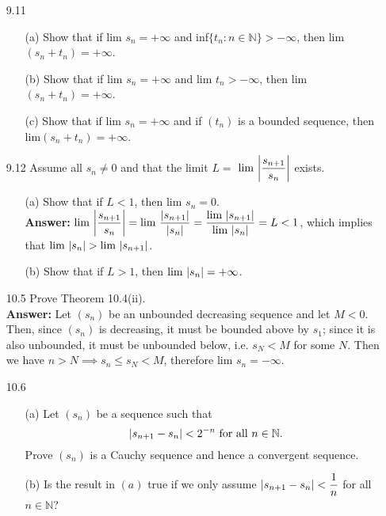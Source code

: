 \documentclass{article}
\begin{document}
\begin{itemize}
\begin{itemize}
\begin{itemize}
                        \end{itemize}
            \end{itemize}
      \item [9.11]
            \begin{itemize}
                  \item [(a)] Show that if $\text{lim }s_n=+\infty$ and inf$\{t_n:n\in\mathbb{N}\}>-\infty$, then lim$(s_n+t_n)=+\infty$.
                  \item [(b)] Show that if $\text{lim }s_n=+\infty$ and $\text{lim }t_n>-\infty$, then lim$(s_n+t_n)=+\infty$.
                  \item [(c)] Show that if $\text{lim }s_n=+\infty$ and if $(t_n)$ is a bounded sequence, then lim$(s_n+t_n)=+\infty$.
            \end{itemize}
      \item [9.12] Assume all $s_n\neq 0$ and that the limit $L=$ $\text{lim }\abs{\dfrac{s_{n+1}}{s_n}}$ exists.
            \begin{itemize}
                  \item [(a)] Show that if $L<1$, then $\text{lim }s_n=0$.\\
                  \textbf{Answer: } $\text{lim }\abs{\dfrac{s_{n+1}}{s_n}}=\text{lim }\dfrac{\abs{s_{n+1}}}{\abs{s_n}}=\dfrac{\text{lim }\abs{s_{n+1}}}{\text{lim }\abs{s_n}}=L<1$, which implies that $\text{lim }\abs{s_n}>\text{lim }\abs{s_{n+1}}$.
                  \item [(b)] Show that if $L>1$, then $\text{lim }\abs{s_n}=+\infty$.
            \end{itemize}
      \item [10.5] Prove Theorem 10.4(ii).\\
      \textbf{Answer: } Let $(s_n)$ be an unbounded decreasing sequence and let $M<0$. Then, since $(s_n)$ is decreasing, it must be bounded above by $s_1$; since it is also unbounded, it must be unbounded below, i.e. $s_N<M$ for some $N$. Then we have $n>N\implies s_n\leq s_N<M$, therefore $\text{lim }s_n=-\infty$.
      \item [10.6] \begin{itemize}
                  \item [(a)] Let $(s_n)$ be a sequence such that \[\abs{s_{n+1}-s_n}<2^{-n} \text{ for all } n\in\mathbb{N}.\] Prove $(s_n)$ is a Cauchy sequence and hence a convergent sequence.
                  \item [(b)] Is the result in $(a)$ true if we only assume $\abs{s_{n+1}-s_n}<\dfrac{1}{n}$ for all $n\in\mathbb{N}$?

\end{itemize}
\end{itemize}
\end{document}
